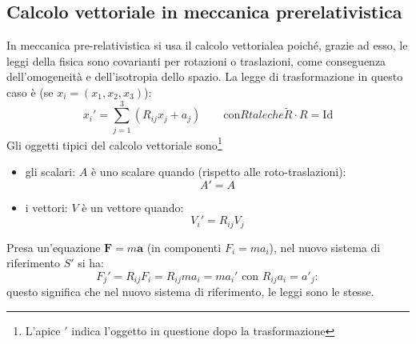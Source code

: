 \subsection{Calcolo vettoriale in meccanica prerelati\-vi\-sti\-ca}
%
In meccanica pre-relativistica si usa il calcolo
vettorialea poich\'e, grazie ad esso,
le leggi della fisica sono covarianti per rotazioni o traslazioni, come
conseguenza dell'omogeneit\`a e dell'isotropia dello spazio. La legge di
trasformazione in questo caso \`e (se $x_i=(x_1,x_2,x_3)$):
\begin{equation}
 x_i'=\sum_{j=1}^3(R_{ij}x_{j}+a_j)\qquad \mbox{con} R { tale che }
\tilde{R}\cdot R=\mbox{Id}
\end{equation}
Gli oggetti tipici del calcolo vettoriale sono\footnote{L'apice $'$
indica l'oggetto in questione dopo la trasformazione}
\begin{itemize} 
 \item gli scalari: $A$ \`e uno scalare quando (rispetto alle
roto-traslazioni):
\begin{equation}
 A'=A
\end{equation}
 \item i vettori: $V$ \`e un vettore quando:
\begin{equation}
 V_{i}'=R_{ij}V_{j}
\end{equation}
\end{itemize}
Presa un'equazione $\mathbf{F}=m\mathbf{a}$ (in componenti $F_i=ma_i$),
nel nuovo sistema di riferimento $S'$ si ha:
\begin{equation}
 F_{j}'=R_{ij}F_i=R_{ij}ma_i=ma_{i}' \mbox{ con } R_{ij} a_i = a'_j:
\end{equation}
questo significa che nel nuovo sistema di riferimento, le leggi
sono le stesse.
